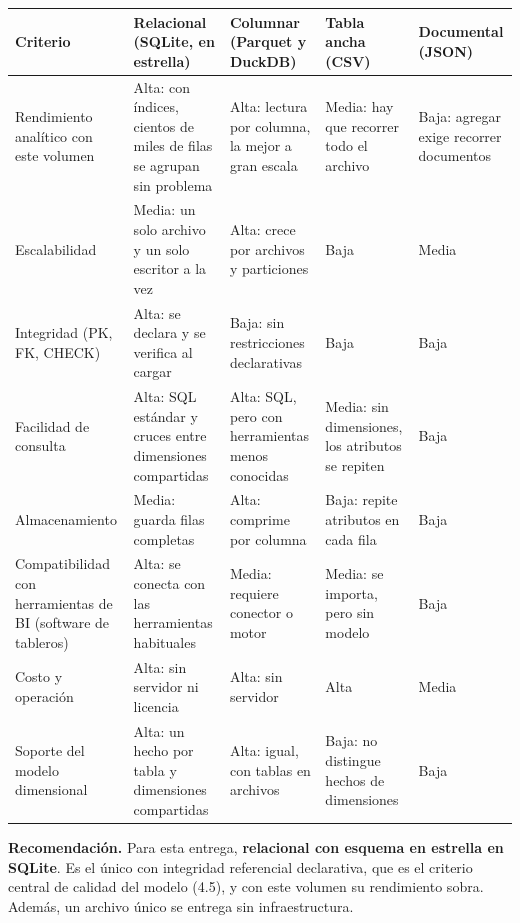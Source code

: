 \documentclass[11pt,letterpaper]{article}
\begin{document}
\begingroup\small\setlength{\tabcolsep}{4pt}\renewcommand{\arraystretch}{1.15}
\begin{longtable}{>{\raggedright\arraybackslash}p{}>{\raggedright\arraybackslash}p{}>{\raggedright\arraybackslash}p{}>{\raggedright\arraybackslash}p{}>{\raggedright\arraybackslash}p{}}
\toprule
\textbf{Criterio} & \textbf{Relacional (SQLite, en estrella)} & \textbf{Columnar (Parquet y DuckDB)} & \textbf{Tabla ancha (CSV)} & \textbf{Documental (JSON)} \\
\midrule
\endhead
Rendimiento analítico con este volumen & Alta: con índices, cientos de miles de filas se agrupan sin problema & Alta: lectura por columna, la mejor a gran escala & Media: hay que recorrer todo el archivo & Baja: agregar exige recorrer documentos \\
Escalabilidad & Media: un solo archivo y un solo escritor a la vez & Alta: crece por archivos y particiones & Baja & Media \\
Integridad (PK, FK, CHECK) & Alta: se declara y se verifica al cargar & Baja: sin restricciones declarativas & Baja & Baja \\
Facilidad de consulta & Alta: SQL estándar y cruces entre dimensiones compartidas & Alta: SQL, pero con herramientas menos conocidas & Media: sin dimensiones, los atributos se repiten & Baja \\
Almacenamiento & Media: guarda filas completas & Alta: comprime por columna & Baja: repite atributos en cada fila & Baja \\
Compatibilidad con herramientas de BI (software de tableros) & Alta: se conecta con las herramientas habituales & Media: requiere conector o motor & Media: se importa, pero sin modelo & Baja \\
Costo y operación & Alta: sin servidor ni licencia & Alta: sin servidor & Alta & Media \\
Soporte del modelo dimensional & Alta: un hecho por tabla y dimensiones compartidas & Alta: igual, con tablas en archivos & Baja: no distingue hechos de dimensiones & Baja \\
\bottomrule
\end{longtable}
\endgroup


\textbf{Recomendación.} Para esta entrega, \textbf{relacional con esquema en estrella en SQLite}. Es el único con integridad referencial declarativa, que es el criterio central de calidad del modelo (4.5), y con este volumen su rendimiento sobra. Además, un archivo único se entrega sin infraestructura.
\end{document}
